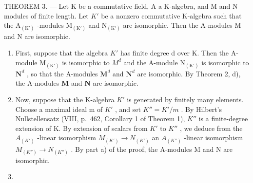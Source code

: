 THEOREM 3. --- Let K be a commutative field, A a K-algebra, and M and N modules of finite length. Let \(K'\) be a nonzero commutative K-algebra such that the \(\mathrm{A}_{(\mathrm{K}')}\) -modules \(\mathrm{M}_{(\mathrm{K}')}\) and \(\mathrm{N}_{(\mathrm{K}')}\) are isomorphic. Then the A-modules M and N are isomorphic.

\begin{enumerate}
\def\labelenumi{\alph{enumi})}
\item
  First, suppose that the algebra \(K'\) has finite degree d over K. Then the A-module \(\mathrm{M}_{(\mathrm{K}')}\) is isomorphic to \(M^{d}\) and the A-module \(\mathrm{N}_{(\mathrm{K}')}\) is isomorphic to \(\mathbf{N}^d\) , so that the A-modules \(\mathbf{M}^d\) and \(\mathbf{N}^d\) are isomorphic. By Theorem 2, d), the A-modules \(\mathbf{M}\) and \(\mathbf{N}\) are isomorphic.
\item
  Now, suppose that the K-algebra \(K'\) is generated by finitely many elements. Choose a maximal ideal m of \(K'\) , and set \(K'' = K'/m\) . By Hilbert's Nullstellensatz (VIII, p.~462, Corollary 1 of Theorem 1), \(K''\) is a finite-degree extension of K. By extension of scalars from \(K'\) to \(K''\) , we deduce from the \(A_{(K')}\) -linear isomorphism \(M_{(K')} \to N_{(K')}\) an \(A_{(K'')}\) -linear isomorphism \(M_{(K'')} \to N_{(K'')}\) . By part a) of the proof, the A-modules M and N are isomorphic.
\item

\end{enumerate}
